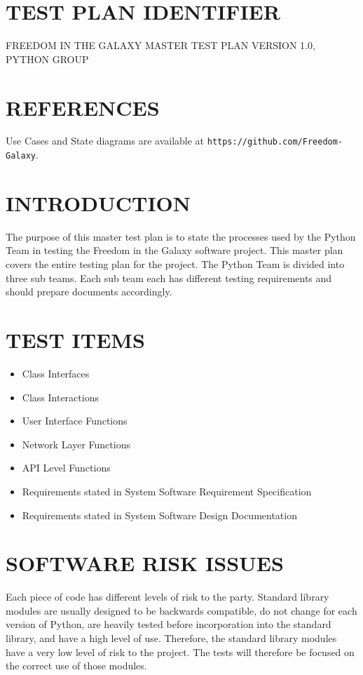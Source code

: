 \documentclass[report]{article}
\begin{document}
\section[IDENTIFIER]{TEST PLAN IDENTIFIER}
FREEDOM IN THE GALAXY MASTER TEST PLAN VERSION 1.0, PYTHON GROUP
\section[REFERENCES]{REFERENCES}
Use Cases and State diagrams are available at {\tt https://github.com/Freedom-Galaxy}.


\section[INTRODUCTION]{INTRODUCTION}
The purpose of this master test plan is to state the processes used by the Python Team in testing the Freedom in the Galaxy software project. This master plan covers the entire testing plan for the project. The Python Team is divided into three sub teams. Each sub team each has different testing requirements and should prepare documents accordingly.

\section[TEST ITEMS]{TEST ITEMS}
\begin{itemize}
\item Class Interfaces
\item Class Interactions
\item User Interface Functions
\item Network Layer Functions
\item API Level Functions
\item Requirements stated in System Software Requirement Specification
\item Requirements stated in System Software Design Documentation
\end{itemize}

\section[SOFTWARE RISK ISSUES]{SOFTWARE RISK ISSUES}
\label{risk}
Each piece of code has different levels of risk to the party. Standard library modules are usually designed to be backwards compatible, do not change for each version of Python, are heavily tested before incorporation into the standard library, and have a high level of use. Therefore, the standard library modules have a very low level of risk to the project. The tests will therefore be focused on the correct use of those modules.
\end{document}

